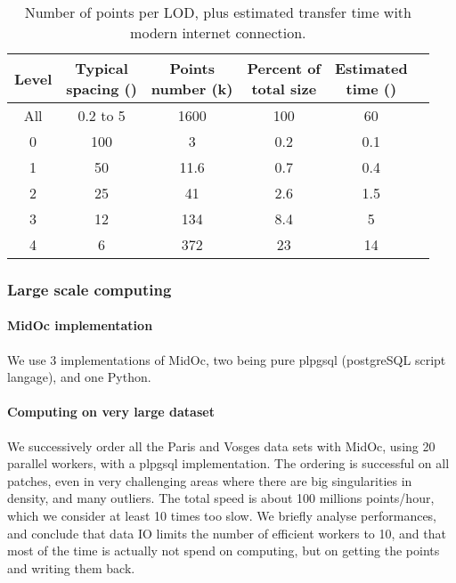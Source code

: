			\begin{table}[ht]
				\centering
				\caption{Number of points per LOD, plus estimated transfer time with modern internet connection.}
				\label{tab:lod-size-time}
				\scriptsize 
				\begin{tabular}{cccccc}
					\bf{Level} & \shortstack{\bf{Typical} \\ \bf{spacing (\centi \meter)}} & \shortstack{ \bf{Points} \\ \bf{number (k)}} & \shortstack{\bf{Percent of} \\ \bf{total size}} & \shortstack{\bf{Estimated} \\ \bf{time (\second)}}   \\
					\hline All & 0.2 to 5  & 1600 & 100 & 60 \\ 
					\hline 0 & 100 & 3 & 0.2 & 0.1 \\ 
					\hline 1 & 50 & 11.6 & 0.7 & 0.4 \\ 
					\hline 2 & 25 & 41 & 2.6 & 1.5 \\ 
					\hline 3 & 12 & 134 & 8.4 & 5 \\ 
					\hline 4 & 6 & 372 & 23 & 14 \\    
				\end{tabular} 
			\end{table}
			 
		\subsubsection{Large scale computing}
		
			\paragraph{MidOc implementation} 
				We use 3 implementations of MidOc, two being pure plpgsql (postgreSQL script langage), and one Python.
			\paragraph{Computing on very large dataset}
				We successively order all the Paris and Vosges data sets with MidOc, using 20 parallel workers, with a plpgsql implementation.
				The ordering is successful on all patches, even in very challenging areas where there are big singularities in density, and many outliers.
				The total speed is about 100 millions points/hour, which we consider at least 10 times too slow.
				We briefly analyse performances, and conclude that data IO limits the number of efficient workers to 10, and that most of the time is actually not spend on computing, but on getting the points and writing them back.
				
